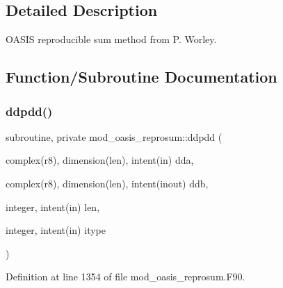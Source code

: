 \subsection{Detailed Description}
O\+A\+S\+IS reproducible sum method from P. Worley. 

\subsection{Function/\+Subroutine Documentation}
\mbox{\label{namespacemod__oasis__reprosum_a24f9efa3ca739811888206eaf71d4690}} 
\subsubsection{\texorpdfstring{ddpdd()}{ddpdd()}}
{\footnotesize\ttfamily subroutine, private mod\+\_\+oasis\+\_\+reprosum\+::ddpdd (\begin{DoxyParamCaption}\item[{complex(r8), dimension(len), intent(in)}]{dda,  }\item[{complex(r8), dimension(len), intent(inout)}]{ddb,  }\item[{integer, intent(in)}]{len,  }\item[{integer, intent(in)}]{itype }\end{DoxyParamCaption})\hspace{0.3cm}{\ttfamily [private]}}



Definition at line 1354 of file mod\+\_\+oasis\+\_\+reprosum.\+F90.

\mbox{\label{namespacemod__oasis__reprosum_a398280c78cff126b7622dbd96af675e4}} 
